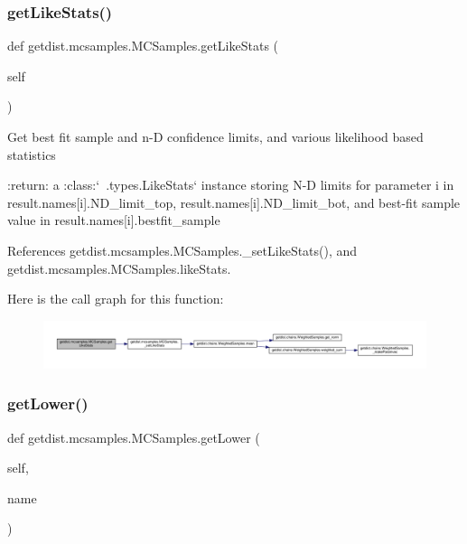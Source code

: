 \subsubsection{\texorpdfstring{get\+Like\+Stats()}{getLikeStats()}}
{\footnotesize\ttfamily def getdist.\+mcsamples.\+M\+C\+Samples.\+get\+Like\+Stats (\begin{DoxyParamCaption}\item[{}]{self }\end{DoxyParamCaption})}

\begin{DoxyVerb}Get best fit sample and n-D confidence limits, and various likelihood based statistics

:return: a :class:`~.types.LikeStats` instance storing N-D limits for parameter i in result.names[i].ND_limit_top, 
 result.names[i].ND_limit_bot, and best-fit sample value in result.names[i].bestfit_sample
\end{DoxyVerb}
 

References getdist.\+mcsamples.\+M\+C\+Samples.\+\_\+set\+Like\+Stats(), and getdist.\+mcsamples.\+M\+C\+Samples.\+like\+Stats.

Here is the call graph for this function\+:
\nopagebreak
\begin{figure}[H]
\begin{center}
\leavevmode
\includegraphics[width=350pt]{classgetdist_1_1mcsamples_1_1MCSamples_aef6e63fe8a242f19517dd5bbdf6d3b2a_cgraph}
\end{center}
\end{figure}
\mbox{\label{classgetdist_1_1mcsamples_1_1MCSamples_ae742dde5f50c4a3acd861a011198fb7a}} 
\subsubsection{\texorpdfstring{get\+Lower()}{getLower()}}
{\footnotesize\ttfamily def getdist.\+mcsamples.\+M\+C\+Samples.\+get\+Lower (\begin{DoxyParamCaption}\item[{}]{self,  }\item[{}]{name }\end{DoxyParamCaption})}

